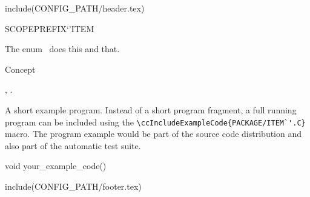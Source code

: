 include(CONFIG_PATH/header.tex)
\begin{ccRefEnum}SCOPE{PREFIX`'ITEM}  %


\ccDefinition
  
The enum \ccRefName\ does this and that.



\ccIsModel

Concept

\ccSeeAlso

,
.

\ccExample

A short example program.
Instead of a short program fragment, a full running program can be
included using the 
\verb|\ccIncludeExampleCode{PACKAGE/ITEM`'.C}| 
macro. The program example would be part of the source code distribution and
also part of the automatic test suite.

\begin{ccExampleCode}
void your_example_code() {
}
\end{ccExampleCode}


\end{ccRefEnum}

include(CONFIG_PATH/footer.tex)
